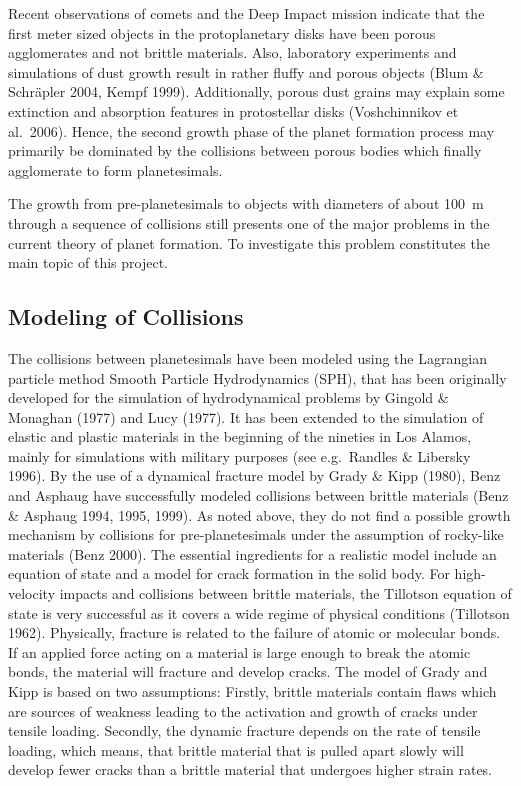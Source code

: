 Recent observations of comets and the Deep Impact mission
indicate that the first meter
sized objects in the protoplanetary disks have been porous agglomerates and
not brittle materials. Also, laboratory experiments and simulations of dust
growth result in rather fluffy and porous objects (Blum \& Schr\"apler 2004,
Kempf 1999).  Additionally, porous dust grains may explain some extinction
and absorption features in protostellar disks (Voshchinnikov et al.~2006).
Hence, the second growth phase of the planet formation process may primarily
be dominated by the collisions between porous bodies which finally
agglomerate to form planetesimals.

The growth from pre-planetesimals to objects with diameters of about
100~m through a sequence of collisions still presents one of the major
problems in the current theory of planet formation. To investigate this
problem constitutes the main topic of this project.
%
\subsection{Modeling of Collisions}
%
The collisions between planetesimals have been modeled using the Lagrangian
particle method Smooth Particle Hydrodynamics (SPH), that has been
originally developed for the simulation of hydrodynamical problems by
Gingold \& Monaghan (1977) and Lucy (1977). It has been extended to the
simulation of elastic and plastic materials in the beginning of the nineties
in Los Alamos, mainly for simulations with military purposes (see
e.g.~Randles \& Libersky 1996).  By the use of a dynamical fracture model by
Grady \& Kipp (1980), Benz and Asphaug have successfully modeled collisions
between brittle materials (Benz \& Asphaug 1994, 1995, 1999). As noted
above, they do not find a possible growth mechanism by collisions for
pre-planetesimals under the assumption of rocky-like materials (Benz
2000). The essential ingredients for a realistic model include an equation
of state and a model for crack formation in the solid body. For
high-velocity impacts and collisions between brittle materials, the
Tillotson equation of state is very successful as it covers a wide regime of
physical conditions (Tillotson 1962). Physically, fracture is related to the
failure of atomic or molecular bonds. If an applied force acting on a
material is large enough to break the atomic bonds, the material will
fracture and develop cracks. The model of Grady and Kipp is based on two
assumptions: Firstly, brittle materials contain flaws which are sources of
weakness leading to the activation and growth of cracks under tensile
loading. Secondly, the dynamic fracture depends on the rate of tensile
loading, which means, that brittle material that is pulled apart slowly will
develop fewer cracks than a brittle material that undergoes higher strain
rates.

